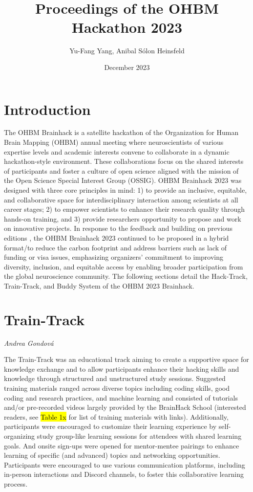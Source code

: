\documentclass{article}
\title{Proceedings of the OHBM Hackathon 2023}
\author{Yu-Fang Yang, Anibal Sólon Heinsfeld}
\date{December 2023}
\newcommand\coordinator[1]{\begin{flushleft}\small\textit{#1}\end{flushleft}}
\begin{document}
\maketitle

\section{Introduction}

The OHBM Brainhack is a satellite hackathon of the Organization for Human Brain Mapping (OHBM) annual meeting where neuroscientists of various expertise levels and academic interests convene to collaborate in a dynamic hackathon-style environment.
These collaborations focus on the shared interests of participants and foster a culture of open science aligned with the mission of the Open Science Special Interest Group (OSSIG).
OHBM Brainhack 2023 was designed with three core principles in mind: 1) to provide an inclusive, equitable, and collaborative space for interdisciplinary interaction among scientists at all career stages; 2) to empower scientists to enhance their research quality through hands-on training, and 3) provide researchers opportunity to propose and work on innovative projects.
In response to the feedback and building on previous editions \cite{Moia2024}, the OHBM Brainhack 2023 continued to be proposed in a hybrid format/to reduce the carbon footprint and address barriers such as lack of funding or visa issues, emphasizing organizers’ commitment to improving diversity, inclusion, and equitable access by enabling broader participation from the global neuroscience community.
The following sections detail the Hack-Track, Train-Track, and Buddy System of the OHBM 2023 Brainhack.

\section{Train-Track}
\coordinator{Andrea Gondová}

The Train-Track was an educational track aiming to create a supportive space for knowledge exchange and to allow participants enhance their hacking skills and knowledge through structured and unstructured study sessions.
Suggested training materials ranged across diverse topics including coding skills, good coding and research practices, and machine learning and consisted of tutorials and/or pre-recorded videos largely provided by the BrainHack School (interested readers, see \hl{Table 1x} for list of training materials with links).
Additionally, participants were encouraged to customize their learning experience by self-organizing study group-like learning sessions for attendees with shared learning goals.
And onsite sign-ups were opened for mentor-mentee pairings to enhance learning of specific (and advanced) topics and networking opportunities.
Participants were encouraged to use various communication platforms, including in-person interactions and Discord channels, to foster this collaborative learning process. 
\end{document}
